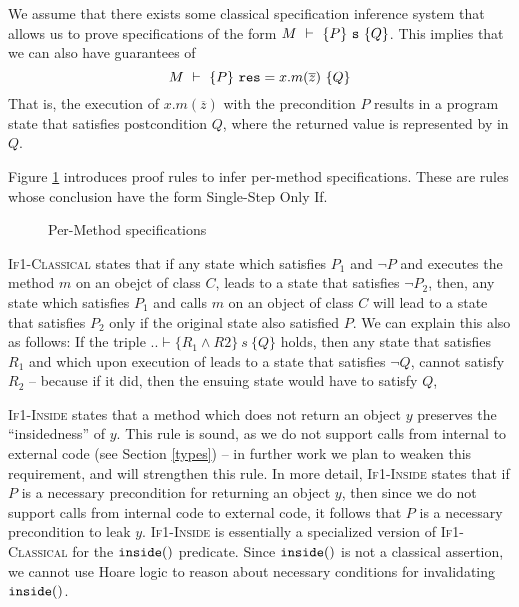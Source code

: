 We assume that there exists some classical specification
inference system  that allows us to prove 
specifications of the form  $M\ \vdash\ \{P\}\ {\texttt{s}}\ \{Q\}$. 
This implies that we can also have guarantees of  
$$M\ \vdash\ \{P\}\ {\texttt{res}} = x.m(\overline{z})\ \{Q\}$$
That is,   %
 the execution of $x.m(\overline{z})$ 
with the precondition $P$ results in a program state that 
satisfies postcondition $Q$, where the returned value is represented
by  in $Q$.

Figure \ref{f:classical->singlestep} introduces  %
proof rules to infer per-method \Nec specifications.
These are rules whose conclusion have the  form Single-Step Only If. 

\begin{figure}[t]
\footnotesize
{}
\caption{Per-Method \Nec specifications}
\label{f:classical->singlestep}
\end{figure}

 

 \textsc{If1-Classical} states that  
if any state which satisfies $P_1$ and $\neg P$ and executes  the method $m$ on an obejct of class $C$, leads to a state that satisfies $\neg P_2$, then, any state which satisfies $P_1$ and calls $m$ on an object of class $C$ will lead to a state that satisfies $P_2$ only if the original state also satisfied $P$.
We can explain this also as follows: If the triple $.. \vdash \{R_1 \wedge R2\}\ s\ \{Q\}$ holds, then any state that satisfies $R_1$ and which upon execution of  leads to a state that satisfies $\neg Q$, cannot satisfy $R_2$ -- because  if it did, then the ensuing state would have to satisfy $Q$,
 


 
\textsc{If1-Inside} states that a method which does not return an object $y$ 
preserves the ``insidedness'' of $y$. 
This rule is sound, as we do not support calls from internal to external code (see Section \ref{types})
-- in further work we plan to weaken this requirement, and will  
strengthen this rule.
In more detail,  \textsc{If1-Inside}   states that if $P$ is
a necessary precondition for returning an object $y$, then  
since we do not support calls from internal code to external code,
it follows that $P$ is a necessary precondition to leak $y$.
\textsc{If1-Inside}  is essentially  a specialized version of \textsc{If1-Classical}
for the $\texttt{inside}(  )$ predicate. Since $\texttt{inside}(  )$ is not a classical
assertion, we cannot use Hoare logic to reason about necessary conditions
for invalidating $\texttt{inside}(  )$.
 
